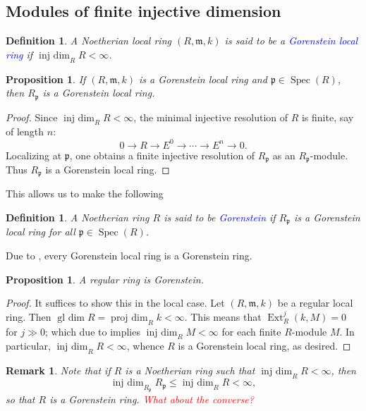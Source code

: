 \documentclass[10pt]{article}
\theoremstyle{thmstyle}
\newtheorem{proposition}[theorem]{Proposition}
\theoremstyle{defstyle}
\newtheorem{definition}[theorem]{Definition}
\newtheorem{remark}[theorem]{Remark}
\newcommand{\Spec}{\operatorname{Spec}}
\newcommand{\frakm}{\mathfrak{m}} %
\newcommand{\frakp}{\mathfrak{p}} %
\newcommand{\define}[1]{\textcolor{blue}{\textit{#1}}}
\renewcommand{\le}{\leqslant}
\newcommand{\Ext}{\operatorname{Ext}}
\newcommand{\projdim}{\operatorname{proj~dim}}
\newcommand{\injdim}{\operatorname{inj~dim}}
\newcommand{\gldim}{\operatorname{gl~dim}}
\begin{document}
\subsection{Modules of finite injective dimension}

\begin{definition}
    A Noetherian local ring $(R,\frakm, k)$ is said to be a \define{Gorenstein local ring} if $\injdim_R R < \infty$.
\end{definition}

\begin{proposition}
    If $(R,\frakm, k)$ is a Gorenstein local ring and $\frakp\in\Spec(R)$, then $R_\frakp$ is a Gorenstein local ring.
\end{proposition}
\begin{proof}
    Since $\injdim_R R < \infty$, the minimal injective resolution of $R$ is finite, say of length $n$: 
    \begin{equation*}
        0\to R\to E^0\to\cdots\to E^n\to 0.
    \end{equation*}
    Localizing at $\frakp$, one obtains a finite injective resolution of $R_\frakp$ as an $R_\frakp$-module. Thus $R_\frakp$ is a Gorenstein local ring.
\end{proof}

This allows us to make the following 
\begin{definition}
    A Noetherian ring $R$ is said to be \define{Gorenstein} if $R_\frakp$ is a Gorenstein local ring for all $\frakp\in\Spec(R)$.
\end{definition}
Due to , every Gorenstein local ring is a Gorenstein ring.

\begin{proposition}
    A regular ring is Gorenstein.
\end{proposition}
\begin{proof}
    It suffices to show this in the local case. Let $(R,\frakm, k)$ be a regular local ring. Then $\gldim R = \projdim_R k < \infty$. This means that $\Ext^j_R(k, M) = 0$ for $j\gg 0$; which due to  implies $\injdim_R M < \infty$ for each finite $R$-module $M$. In particular, $\injdim_R R < \infty$, whence $R$ is a Gorenstein local ring, as desired.
\end{proof}

\begin{remark}
    Note that if $R$ is a Noetherian ring such that $\injdim_R R < \infty$, then 
    \begin{equation*}
        \injdim_{R_\frakp} R_\frakp\le\injdim_R R < \infty,
    \end{equation*}
    so that $R$ is a Gorenstein ring. \textcolor{red}{What about the converse?}
\end{remark}
\end{document}
